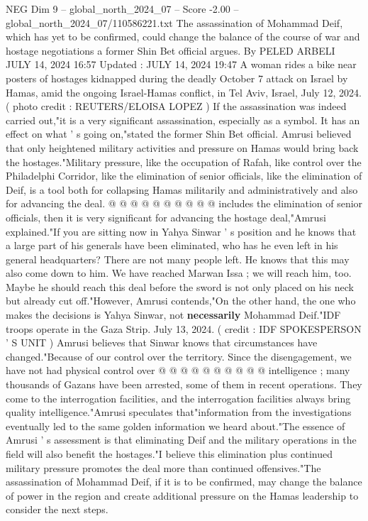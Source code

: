 \begin{textsample}{NEG Dim 9 – global\_north\_2024\_07 – Score -2.00 – global\_north\_2024\_07/110586221.txt}  \label{ex:f9_neg_140}
The assassination of Mohammad Deif, which has yet to be confirmed, could change the balance of the course of war and hostage negotiations a former Shin Bet official argues.
By PELED ARBELI JULY 14, 2024 16:57 Updated : JULY 14, 2024 19:47 A woman rides a bike near posters of hostages kidnapped during the deadly October 7 attack on Israel by Hamas, amid the ongoing Israel-Hamas conflict, in Tel Aviv, Israel, July 12, 2024. ( photo credit : REUTERS/ELOISA LOPEZ ) If the assassination was indeed carried out,"it is a very significant assassination, especially as a symbol.
It has an effect on what ' s going on,"stated the former Shin Bet official.
Amrusi believed that only heightened military activities and pressure on Hamas would bring back the hostages."Military pressure, like the occupation of Rafah, like control over the Philadelphi Corridor, like the elimination of senior officials, like the elimination of Deif, is a tool both for collapsing Hamas militarily and administratively and also for advancing the deal. @ @ @ @ @ @ @ @ @ @ includes the elimination of senior officials, then it is very significant for advancing the hostage deal,"Amrusi explained."If you are sitting now in Yahya Sinwar ' s position and he knows that a large part of his generals have been eliminated, who has he even left in his general headquarters?
There are not many people left.
He knows that this may also come down to him.
We have reached Marwan Issa ; we will reach him, too.
Maybe he should reach this deal before the sword is not only placed on his neck but already cut off."However, Amrusi contends,"On the other hand, the one who makes the decisions is Yahya Sinwar, not \textbf{necessarily} Mohammad Deif."IDF troops operate in the Gaza Strip.
July 13, 2024. ( credit : IDF SPOKESPERSON ' S UNIT ) Amrusi believes that Sinwar knows that circumstances have changed."Because of our control over the territory.
Since the disengagement, we have not had physical control over @ @ @ @ @ @ @ @ @ @ intelligence ; many thousands of Gazans have been arrested, some of them in recent operations.
They come to the interrogation facilities, and the interrogation facilities always bring quality intelligence."Amrusi speculates that"information from the investigations eventually led to the same golden information we heard about."The essence of Amrusi ' s assessment is that eliminating Deif and the military operations in the field will also benefit the hostages."I believe this elimination plus continued military pressure promotes the deal more than continued offensives."The assassination of Mohammad Deif, if it is to be confirmed, may change the balance of power in the region and create additional pressure on the Hamas leadership to consider the next steps.

\end{textsample}
